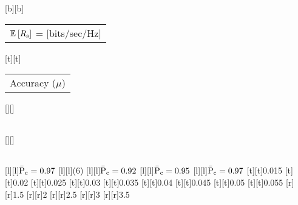 %    
%
%
%
[b][b]{\fontsize{9}{13.5}\selectfont \color[rgb]{0,0,0}\setlength{\tabcolsep}{0pt}\begin{tabular}{c}${\mathbb E}_{}\left[ R_{\text{s}} \right]$ = [bits/sec/Hz]\end{tabular}}%
[t][t]{\fontsize{9}{13.5}\selectfont \color[rgb]{0,0,0}\setlength{\tabcolsep}{0pt}\begin{tabular}{c}Accuracy ($\mu$)\end{tabular}}%
[][]{\fontsize{10}{15}\selectfont \color[rgb]{0,0,0}\setlength{\tabcolsep}{0pt}\begin{tabular}{c} \end{tabular}}%
[][]{\fontsize{10}{15}\selectfont \color[rgb]{0,0,0}\setlength{\tabcolsep}{0pt}\begin{tabular}{c} \end{tabular}}%
[l][l]{\fontsize{9}{13.5}\selectfont \color[rgb]{0,0,0}$\bar{\text{P}}_{\text{c}} = 0.97$}%
[l][l]{\fontsize{9}{13.5}\selectfont \color[rgb]{0,0,0}(6)}%
[l][l]{\fontsize{9}{13.5}\selectfont \color[rgb]{0,0,0}$\bar{\text{P}}_{\text{c}} = 0.92$}%
[l][l]{\fontsize{9}{13.5}\selectfont \color[rgb]{0,0,0}$\bar{\text{P}}_{\text{c}} = 0.95$}%
[l][l]{\fontsize{9}{13.5}\selectfont \color[rgb]{0,0,0}$\bar{\text{P}}_{\text{c}} = 0.97$}%
%
\fontsize{9}{13.5}%
\selectfont%
%
[t][t]{0.015}%
[t][t]{0.02}%
[t][t]{0.025}%
[t][t]{0.03}%
[t][t]{0.035}%
[t][t]{0.04}%
[t][t]{0.045}%
[t][t]{0.05}%
[t][t]{0.055}%
%
[r][r]{1.5}%
[r][r]{2}%
[r][r]{2.5}%
[r][r]{3}%
[r][r]{3.5}%
%
%
